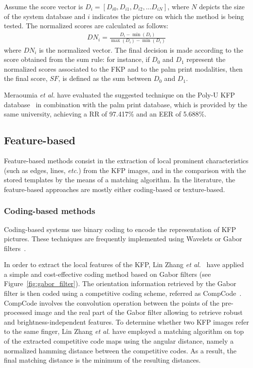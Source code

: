 \documentclass[journal]{IEEEtran}
\begin{document}
Assume the score vector is $D_i = [D_{i0}, D_{i1}, D_{i2}, \dots D_{iN}]$, where $N$ depicts the size of the system database and $i$ indicates the picture on which the method is being tested.
The normalized scores are calculated as follows: 
\begin{align*}
    DN_i = \frac{D_i - \min(D_i)}{\max(D_i) - \min(D_i)} \label{eq:2}
\end{align*}
where $DN_i$ is the normalized vector. The final decision is made according to the score obtained from the sum rule: for instance, if $D_0$ and $D_1$ represent the normalized scores associated to the FKP and to the palm print modalities, then the final score, $SF$, is defined as the sum between $D_0$ and $D_1$.

Meraoumia \textit{et al.} have evaluated the suggested technique on the Poly-U KFP database~\cite{polyu1} in combination with the palm print database, which is provided by the same university, achieving a RR of 97.417\% and an EER of 5.688\%.

\subsection{Feature-based}
Feature-based methods consist in the extraction of local prominent characteristics (such as edges, lines, \textit{etc.}) from the KFP images, and in the comparison with the stored templates by the means of a matching algorithm. 
In the literature, the feature-based approaches are mostly either coding-based or texture-based.

\subsubsection{Coding-based methods}
Coding-based systems use binary coding to encode the representation of KFP pictures. These techniques are frequently implemented using Wavelets or Gabor filters~\cite{biometricknuckleprint}.

In order to extract the local features of the KFP, Lin Zhang \textit{et al.}~\cite{Zhang1} have applied a simple and cost-effective coding method based on Gabor filters (see Figure~\ref{fig:gabor_filter}). The orientation information retrieved by the Gabor filter is then coded using a competitive coding scheme, referred as CompCode~\cite{ZHANG20111990}. CompCode involves the convolution operation between the points of the pre-processed image and the real part of the Gabor filter allowing to retrieve robust and brightness-independent features.
To determine whether two KFP images refer to the same finger, Lin Zhang \textit{et al.} have employed a matching algorithm on top of the extracted competitive code maps using the angular distance, namely a normalized hamming distance between the competitive codes. As a result, the final matching distance is the minimum of the resulting distances.
\end{document}
